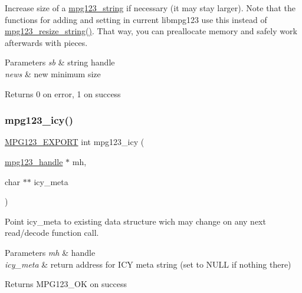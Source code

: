 Increase size of a \mbox{\hyperlink{structmpg123__string}{mpg123\+\_\+string}} if necessary (it may stay larger). Note that the functions for adding and setting in current libmpg123 use this instead of \mbox{\hyperlink{group__mpg123__metadata_ga57ddead33785908618a5c0c7f3c1895a}{mpg123\+\_\+resize\+\_\+string()}}. That way, you can preallocate memory and safely work afterwards with pieces. 
\begin{DoxyParams}{Parameters}
{\em sb} & string handle \\
\hline
{\em news} & new minimum size \\
\hline
\end{DoxyParams}
\begin{DoxyReturn}{Returns}
0 on error, 1 on success 
\end{DoxyReturn}
\mbox{\label{group__mpg123__metadata_ga637c01818ba80ac2275b76a8abefa36c}} 
\subsubsection{\texorpdfstring{mpg123\_icy()}{mpg123\_icy()}}
{\footnotesize\ttfamily \mbox{\hyperlink{mpg123_8h_a2ba98cfba3f760879df70e755b2a61cc}{M\+P\+G123\+\_\+\+E\+X\+P\+O\+RT}} int mpg123\+\_\+icy (\begin{DoxyParamCaption}\item[{\mbox{\hyperlink{group__mpg123__init_ga6728e2839a395f3a07d4514da659faca}{mpg123\+\_\+handle}} $\ast$}]{mh,  }\item[{char $\ast$$\ast$}]{icy\+\_\+meta }\end{DoxyParamCaption})}

Point icy\+\_\+meta to existing data structure wich may change on any next read/decode function call. 
\begin{DoxyParams}{Parameters}
{\em mh} & handle \\
\hline
{\em icy\+\_\+meta} & return address for I\+CY meta string (set to N\+U\+LL if nothing there) \\
\hline
\end{DoxyParams}
\begin{DoxyReturn}{Returns}
M\+P\+G123\+\_\+\+OK on success 
\end{DoxyReturn}
\mbox{\label{group__mpg123__metadata_ga0a6e45c3f8dda42ada8a07c29c253c88}} 
